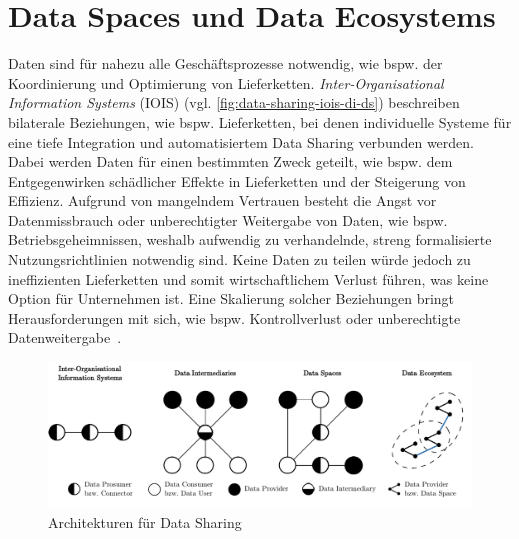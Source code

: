 
\section{Data Spaces und Data Ecosystems}

Daten sind für nahezu alle Geschäftsprozesse notwendig, wie bspw. der Koordinierung und Optimierung von Lieferketten.
\emph{Inter-Organisational Information Systems} (IOIS) (vgl. \autoref{fig:data-sharing-iois-di-ds}) beschreiben bilaterale Beziehungen, wie bspw. Lieferketten, bei denen individuelle Systeme für eine tiefe Integration und automatisiertem Data Sharing verbunden werden.
Dabei werden Daten für einen bestimmten Zweck geteilt, wie bspw. dem Entgegenwirken schädlicher Effekte in Lieferketten und der Steigerung von Effizienz.
Aufgrund von mangelndem Vertrauen besteht die Angst vor Datenmissbrauch oder unberechtigter Weitergabe von Daten, wie bspw. Betriebsgeheimnissen, weshalb aufwendig zu verhandelnde, streng formalisierte Nutzungsrichtlinien notwendig sind.
Keine Daten zu teilen würde jedoch zu ineffizienten Lieferketten und somit wirtschaftlichem Verlust führen, was keine Option für Unternehmen ist.
Eine Skalierung solcher Beziehungen bringt Herausforderungen mit sich, wie bspw. Kontrollverlust oder unberechtigte Datenweitergabe~\cite{mollerIndustrialDataEcosystems2024}.

\begin{figure}
    \includegraphics[width=\textwidth]{./assets/data_sharing_architectures.drawio.pdf}
    \caption{Architekturen für Data Sharing~\cite[vgl.][]{mollerIndustrialDataEcosystems2024}}
    \label{fig:data-sharing-iois-di-ds}
\end{figure}

